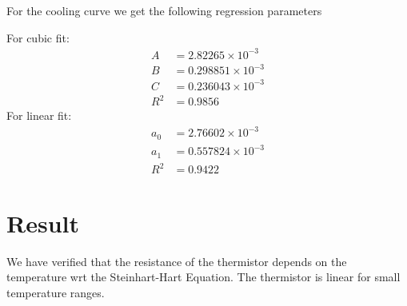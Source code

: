 \documentclass[12pt]{article}
\newlength\fwidth
\newlength\fheight
\begin{document}
\begin{figure}[H]
    \centering
    \setlength{}
    \setlength{}
    
\end{figure}
For the cooling curve we get the following regression parameters

\noindent For cubic fit:
\begin{align*}
    A &= 2.82265 \times 10^{-3} \\
    B &= 0.298851 \times 10^{-3} \\
    C &= 0.236043 \times 10^{-3} \\
    R^{2}&=0.9856
\end{align*}
For linear fit:
\begin{align*}
    a_0 &= 2.76602 \times 10^{-3} \\
    a_1 &= 0.557824 \times 10^{-3} \\
    R^{2}&=0.9422
\end{align*}
\section*{Result}
We have verified that the resistance of the thermistor depends on the temperature wrt the Steinhart-Hart Equation. The thermistor is linear for small temperature ranges.
\end{document}
